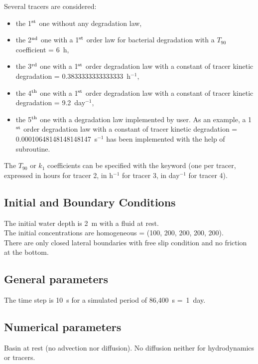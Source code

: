 Several tracers are considered:
\begin{itemize}
\item the 1$^{\rm{st}}$ one without any degradation law,
\item the 2$^{\rm{nd}}$ one with a 1$^{\rm{st}}$ order law for bacterial
  degradation with a $T_{90}$ coefficient = 6~h,
\item the 3$^{\rm{rd}}$ one with a 1$^{\rm{st}}$ order degradation law with
  a constant of tracer kinetic degradation = 0.3833333333333333~h$^{-1}$,
\item the 4$^{\rm{th}}$ one with a 1$^{\rm{st}}$ order degradation law with
  a constant of tracer kinetic degradation = 9.2~day$^{-1}$,
\item the 5$^{\rm{th}}$ one with a degradation law implemented by user.
  As an example, a 1$^{\rm{st}}$ order degradation law with
  a constant of tracer kinetic degradation = 0.00010648148148148147~s$^{-1}$
  has been implemented
  with the help of  subroutine.
\end{itemize}

The $T_{90}$ or $k_1$ coefficients can be specified with the keyword
(one per tracer, expressed in hours for tracer 2, in h$^{-1}$ for tracer 3,
in day$^{-1}$ for tracer 4).

\subsection{Initial and Boundary Conditions}

The initial water depth is 2~m with a fluid at rest.\\
%
The initial concentrations are homogeneous
= (100, 200, 200, 200, 200).\\
%
There are only closed lateral boundaries with free slip condition and no
friction at the bottom.

\subsection{General parameters}

The time step is 10~s for a simulated period of 86,400~s =~1~day.

\subsection{Numerical parameters}

Basin at rest (no advection nor diffusion).
No diffusion neither for hydrodynamics or tracers.\\

